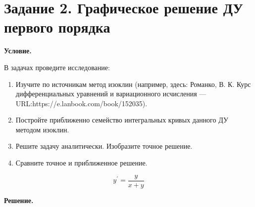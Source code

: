 \section{Задание 2. Графическое решение ДУ первого порядка}

\textbf{Условие.}

В задачах проведите исследование:
\begin{enumerate}
    \item Изучите по источникам метод изоклин (например, здесь: Романко, В. К. Курс дифференциальных уравнений и вариационного исчисления — URL:https://e.lanbook.com/book/152035).

    \item Постройте приближенно семейство интегральных кривых данного ДУ методом изоклин.

    \item Решите задачу аналитически. Изобразите точное решение.

    \item Сравните точное и приближенное решение.
\end{enumerate}

\[y^\prime = \frac{y}{x + y}\]

\vspace{10mm}
\textbf{Решение.}

